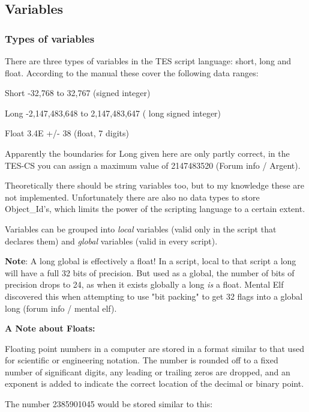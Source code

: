 \hypertarget{variables}{%
\subsection{Variables}\label{variables}}

\hypertarget{types-of-variables}{%
\subsubsection{Types of variables}\label{types-of-variables}}

There are three types of variables in the TES script language: short,
long and float. According to the manual these cover the following data
ranges:

	Short -32,768 to 32,767 (signed integer)
	
	Long -2,147,483,648 to 2,147,483,647 ( long signed integer)
	
	Float 3.4E +/- 38 (float, 7 digits)

Apparently the boundaries for Long given here are only partly correct,
in the TES-CS you can assign a maximum value of 2147483520 (Forum info /
Argent).

Theoretically there should be string variables too, but to my knowledge
these are not implemented. Unfortunately there are also no data types to
store Object\_Id's, which limits the power of the scripting language to
a certain extent.

Variables can be grouped into \emph{local} variables (valid only in the
script that declares them) and \emph{global} variables (valid in every
script).

\textbf{Note}: A long global is effectively a float! In a script, local
to that script a long will have a full 32 bits of precision. But used as
a global, the number of bits of precision drops to 24, as when it exists
globally a long \emph{is} a float. Mental Elf discovered this when
attempting to use "bit packing" to get 32 flags into a global long
(forum info / mental elf).

\textbf{A Note about Floats:}

Floating point numbers in a computer are stored in a format similar to
that used for scientific or engineering notation. The number is rounded
off to a fixed number of significant digits, any leading or trailing
zeros are dropped, and an exponent is added to indicate the correct
location of the decimal or binary point.

The number 2385901045 would be stored similar to this:

